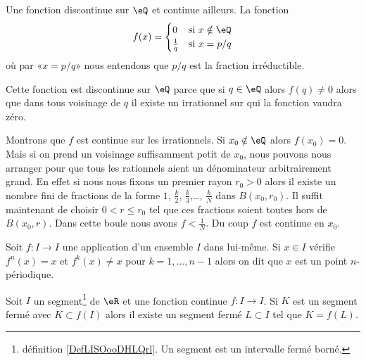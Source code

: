 \begin{example}
    Une fonction discontinue sur \( \eQ\) et continue ailleurs. La fonction 
    \begin{equation}
        f(x)=\begin{cases}
            0    &   \text{si } x\notin \eQ\\
            \frac{1}{ q }    &    \text{si } x=p/q
        \end{cases}
    \end{equation}
    où par «\( x=p/q\)» nous entendons que \( p/q\) est la fraction irréductible.

    Cette fonction est discontinue sur \( \eQ\) parce que si \( q\in \eQ\) alors \( f(q)\neq 0\) alors que dans tous voisinage de \( q\) il existe un irrationnel sur qui la fonction vaudra zéro.

    Montrons que \( f\) est continue sur les irrationnels. Si \( x_0\notin \eQ\) alors \( f(x_0)=0\). Mais si on prend un voisinage suffisamment petit de \( x_0\), nous pouvons nous arranger pour que tous les rationnels aient un dénominateur arbitrairement grand. En effet si nous nous fixons un premier rayon \( r_0>0\) alors il existe un nombre fini de fractions de la forme \( 1\), \( \frac{ k }{2}\), \( \frac{ k }{ 3 }\),\ldots, \( \frac{ k }{ N }\) dans \( B(x_0,r_0)\). Il suffit maintenant de choisir \( 0<r\leq r_0\) tel que ces fractions soient toutes hors de \( B(x_0,r)\). Dans cette boule nous avons \( f<\frac{1}{ N }\). Du coup \( f\) est continue en \( x_0\).
\end{example}

\begin{definition}
    Soit \( f\colon I\to I\) une application d'un ensemble \( I\) dans lui-même. Si \( x\in I\) vérifie \( f^n(x)=x\) et \( f^k(x)\neq x\) pour \( k=1,\ldots, n-1\) alors on dit que \( x\) est un point \( n\)-périodique.
\end{definition}

\begin{lemma}       \label{LemAONBooGZBuYt}
    Soit \( I\) un segment\footnote{définition \ref{DefLISOooDHLQrl}. Un segment est un intervalle fermé borné.} de \( \eR\) et une fonction continue \( f\colon I\to I\). Si \( K\) est un segment fermé avec \( K\subset f(I)\) alors il existe un segment fermé \( L\subset I\) tel que \( K=f(L)\).
\end{lemma}

